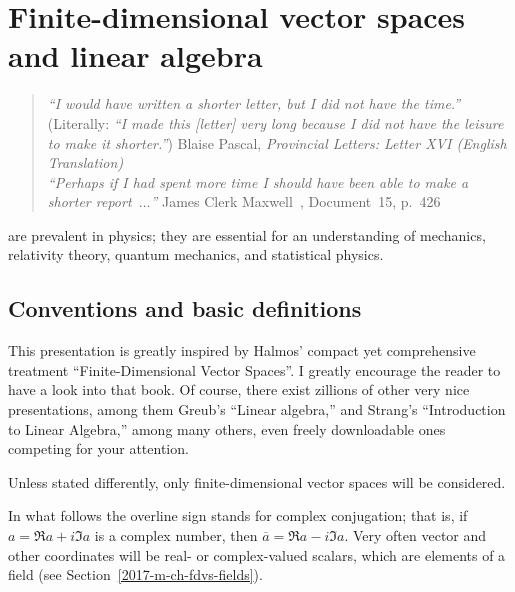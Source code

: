 \chapter{Finite-dimensional vector spaces and linear algebra}
\label{ch:lvs}

\begin{quote}
{\it ``I would have written a shorter letter, but I did not have the time.''}
(Literally: {\it ``I made this [letter] very long because I did not have the leisure to make it shorter.''})
Blaise Pascal, {\it Provincial Letters: Letter XVI (English Translation)}\\
{\it ``Perhaps if I had spent more time I should have been able to make a shorter report~$\ldots$''}
James Clerk Maxwell~\cite[-20mm]{garber}, Document~15,  p.~426
\end{quote}

 are prevalent in physics;
they are essential for an understanding
of mechanics, relativity theory, quantum mechanics, and statistical physics.

\section{Conventions and basic definitions}



This presentation is greatly inspired
by Halmos' compact yet comprehensive treatment
``Finite-Dimensional Vector Spaces''.\cite[-40mm]{halmos-vs}
I greatly encourage the reader to have a look into that book.
Of course, there exist zillions of other very nice presentations, among them
Greub's ``Linear algebra,'' and
Strang's ``Introduction to Linear Algebra,''
among many others, even freely downloadable  ones
\cite[-30mm]{Greub75,Strang:2009:ILA,Homes-rorres,lipschutz:schaul-la,Hefferon}
competing for your attention.

Unless stated differently, only
finite-dimensional vector spaces will be considered.

In what follows
the overline sign stands for complex conjugation; that is,
if
${a}= \Re a +i\Im a $ is a complex number, then
$\overline{a}= \Re a -i\Im a$.
Very often vector and other coordinates will be real- or complex-valued scalars, which are elements of a field (see Section~\ref{2017-m-ch-fdvs-fields}).

